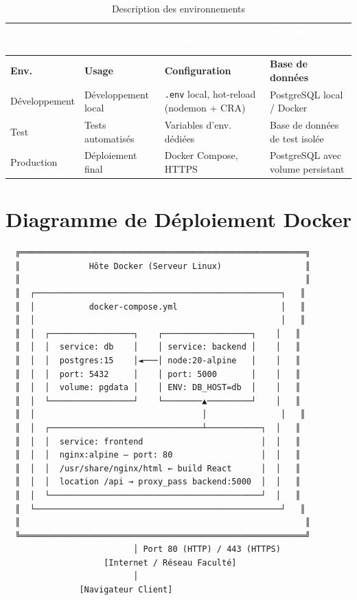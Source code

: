 \documentclass[12pt,a4paper]{report}
\begin{document}
\begin{longtable}{|L{2.5cm}|L{3.5cm}|L{3.5cm}|L{4cm}|}
\caption{Description des environnements} \\
\hline
{}\textcolor{white}{\textbf{Env.}} & \textcolor{white}{\textbf{Usage}} & \textcolor{white}{\textbf{Configuration}} & \textcolor{white}{\textbf{Base de données}} \\
\hline
\endfirsthead
\hline
\textbf{Env.} & \textbf{Usage} & \textbf{Configuration} & \textbf{Base de données} \\
\hline
\endhead
Développement & Développement local & \texttt{.env} local, hot-reload (nodemon + CRA) & PostgreSQL local / Docker \\
\hline
Test & Tests automatisés & Variables d'env. dédiées & Base de données de test isolée \\
\hline
Production & Déploiement final & Docker Compose, HTTPS & PostgreSQL avec volume persistant \\
\hline
\end{longtable}

\section{Diagramme de Déploiement Docker}

\begin{center}
\begin{verbatim}
  ╔══════════════════════════════════════════════════════════╗
  ║              Hôte Docker (Serveur Linux)                 ║
  ║                                                          ║
  ║  ┌──────────────────────────────────────────────────┐   ║
  ║  │           docker-compose.yml                     │   ║
  ║  │                                                  │   ║
  ║  │  ┌─────────────────┐    ┌──────────────────┐    │   ║
  ║  │  │  service: db    │    │ service: backend │    │   ║
  ║  │  │  postgres:15    │◄───│ node:20-alpine   │    │   ║
  ║  │  │  port: 5432     │    │ port: 5000       │    │   ║
  ║  │  │  volume: pgdata │    │ ENV: DB_HOST=db  │    │   ║
  ║  │  └─────────────────┘    └────────▲─────────┘    │   ║
  ║  │                                  │               │   ║
  ║  │  ┌───────────────────────────────┴───────────┐  │   ║
  ║  │  │  service: frontend                        │  │   ║
  ║  │  │  nginx:alpine — port: 80                  │  │   ║
  ║  │  │  /usr/share/nginx/html ← build React      │  │   ║
  ║  │  │  location /api → proxy_pass backend:5000  │  │   ║
  ║  │  └───────────────────────────────────────────┘  │   ║
  ║  └──────────────────────────────────────────────────┘   ║
  ║                                                          ║
  ╚══════════════════════════════════════════════════════════╝
                          │ Port 80 (HTTP) / 443 (HTTPS)
                    [Internet / Réseau Faculté]
                          │
               [Navigateur Client]
\end{verbatim}
\end{center}
\end{document}
